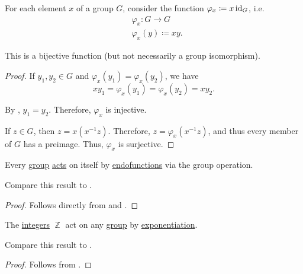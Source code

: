 \begin{lemma}\label{thm:group_multiplication_is_bijection}
  For each element \( x \) of a group \( G \), consider the function \( \varphi_x \coloneqq x \operatorname{id}_G \), i.e.
  \begin{equation*}
    \begin{aligned}
      &\varphi_x: G \to G \\
      &\varphi_x(y) \coloneqq xy.
    \end{aligned}
  \end{equation*}

  This is a bijective function (but not necessarily a group isomorphism).
\end{lemma}
\begin{proof}
   If \( y_1, y_2 \in G \) and \( \varphi_x(y_1) = \varphi_x(y_2) \), we have
  \begin{equation*}
    xy_1 = \varphi_x(y_1) = \varphi_x(y_2) = xy_2.
  \end{equation*}

  By , \( y_1 = y_2 \). Therefore, \( \varphi_x \) is injective.

   If \( z \in G \), then \( z = x(x^{-1} z) \). Therefore, \( z = \varphi_x(x^{-1} z) \), and thus every member of \( G \) has a preimage. Thus, \( \varphi_x \) is surjective.
\end{proof}

\begin{theorem}\label{thm:cayleys_theorem}
  Every \hyperref[def:group]{group} \hyperref[def:group_action]{acts} on itself by \hyperref[def:multi_valued_function/endofunction]{endofunctions} via the group operation.

  Compare this result to .
\end{theorem}
\begin{proof}
  Follows directly from  and .
\end{proof}

\begin{proposition}\label{thm:integers_group_action}
  The \hyperref[def:set_of_integers]{integers} \( \BbbZ \) act on any \hyperref[def:group]{group} by \hyperref[def:group/exponentiation]{exponentiation}.

  Compare this result to .
\end{proposition}
\begin{proof}
  Follows from .
\end{proof}

